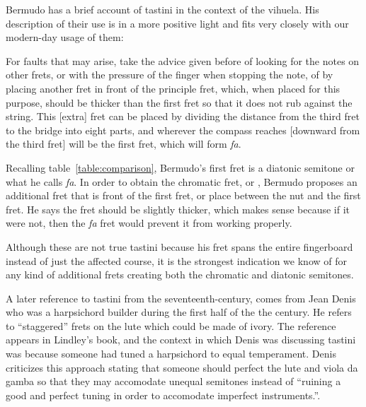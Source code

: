 Bermudo has a brief account of tastini in the context of the vihuela.  His description
of their use is in a more positive light and fits very closely with our modern-day
usage of them:
\begin{blocks}
For faults that may arise, take the advice given before of looking for the notes on other
frets, or with the pressure of the finger when stopping the note, of by placing another
fret in front of the principle fret, which, when placed for this purpose, should be
thicker than the first fret so that it does not rub against the string. This [extra]
fret can be placed by dividing the distance from the third fret to the bridge into eight
parts, and wherever the compass reaches [downward from the third fret] will be the first
fret, which will form \textit{fa}. \autocite[115-116]{DE:1}
\end{blocks}
Recalling table~\ref{table:comparison}, Bermudo's first fret is a diatonic semitone or what
he calls \textit{fa}.  In order to obtain the chromatic fret, or , Bermudo
proposes an additional fret that is front of the first fret, or place between the nut
and the first fret.  He says the fret should be slightly thicker, which makes sense
because if it were not, then the \textit{fa} fret would prevent it from working
properly.

Although these are not true tastini because his fret spans the entire
fingerboard instead of just the affected course, it is the strongest indication we know
of for any kind of additional frets creating both the chromatic and diatonic semitones.

A later reference to tastini from the seventeenth-century, comes from Jean Denis who
was a harpsichord builder during the first half of the the century.  He refers to
``staggered'' frets on the lute which could be made of ivory.  The reference appears in
Lindley's book, and the context in which Denis was discussing tastini was because
someone had tuned a harpsichord to equal temperament.  Denis criticizes this approach
stating that someone should perfect the lute and viola da gamba so that they may
accomodate unequal semitones instead of ``ruining a good and perfect tuning in order to
accomodate imperfect instruments.''\autocite[47]{ML:1}.

